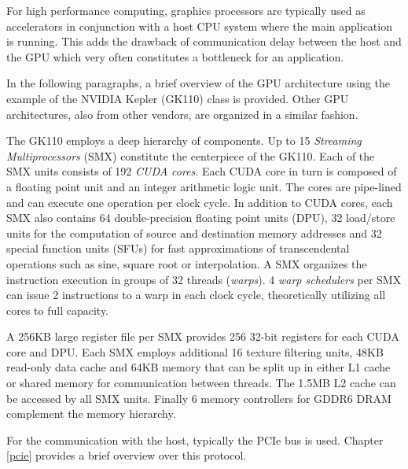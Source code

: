For high performance computing, graphics processors are typically used as accelerators in conjunction with a host CPU system where the main application is running.
This adds the drawback of communication delay between the host and the GPU which very often constitutes a bottleneck for an application.



In the following paragraphs, a brief overview of the GPU architecture using the example of the NVIDIA Kepler (GK110) class is provided. Other GPU architectures, also from other vendors, are organized in a similar fashion.


The GK110 employs a deep hierarchy of components. 
Up to 15 \emph{Streaming Multiprocessors} (SMX) constitute the centerpiece of the GK110. Each of the SMX units consists of 192 \emph{CUDA cores}.
Each CUDA core in turn is composed of a floating point unit and an integer arithmetic logic unit. The cores are pipe-lined and can execute one operation per clock cycle.
In addition to CUDA cores, each SMX also contains 64 double-precision floating point units (DPU), 32 load/store units for the computation of source and destination memory addresses and 32 special function units (SFUs) for fast approximations of transcendental operations such as sine, square root or interpolation.
A SMX organizes the instruction execution in groups of 32 threads (\emph{warps}). 4 \emph{warp schedulers} per SMX can issue 2 instructions to a warp in each clock cycle, theoretically utilizing all cores to full capacity. \cite{gk110} 

A 256KB large register file per SMX provides 256 32-bit registers for each CUDA core and DPU. Each SMX employs additional 16 texture filtering units, 48KB read-only data cache and 64KB memory that can be split up in either L1 cache or shared memory for communication between threads.
The 1.5MB L2 cache can be accessed by all SMX units. Finally 6 memory controllers for GDDR6 DRAM complement the memory hierarchy. \cite{gk110} 

For the communication with the host, typically the PCIe bus is used. Chapter \ref{pcie} provides a brief overview over this protocol.





